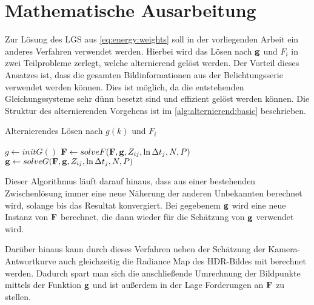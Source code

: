 \chapter{Mathematische Ausarbeitung}
\label{chap:maths}
Zur Lösung des \gls{LGS} aus \autoref{eq:energy:weights} soll in der vorliegenden Arbeit ein anderes Verfahren verwendet werden. Hierbei wird das Lösen nach $\b g$ und $F_i$ in zwei Teilprobleme zerlegt, welche alternierend gelöst werden. Der Vorteil dieses Ansatzes ist, dass die gesamten Bildinformationen aus der Belichtungsserie verwendet werden können. Dies ist möglich, da die entstehenden Gleichungssysteme sehr dünn besetzt sind und effizient gelöst werden können. Die Struktur des alternierenden Vorgehens ist im \autoref{alg:alternierend:basic} beschrieben.

\begin{Algorithmus} %
\caption{Alternierendes Lösen nach $g(k)$ und $F_i$}
\label{alg:alternierend:basic}
\begin{algorithmic}
	\State $g \gets initG()$
		\State $\mathbf F \gets solveF(\mathbf F, \mathbf g, Z_{ij}, \ln \Delta t_j, N, P)$ 
		\State $\mathbf g \gets solveG(\mathbf F, \mathbf g, Z_{ij}, \ln \Delta t_j, N, P)$
	\EndWhile
	\State \Return [$\b g$, $\b F$]
\EndFunction
\end{algorithmic}
\end{Algorithmus}

Dieser Algorithmus läuft darauf hinaus, dass aus einer bestehenden Zwischenlösung immer eine neue Näherung der anderen Unbekannten berechnet wird, solange bis das Resultat konvergiert. Bei gegebenem $\b g$ wird eine neue Instanz von $\b F$ berechnet, die dann wieder für die Schätzung von $\b g$ verwendet wird. 

Darüber hinaus kann durch dieses Verfahren neben der Schätzung der Kamera-Antwortkurve auch gleichzeitig die \gls{Radiance Map} des \gls{HDR}-Bildes mit berechnet werden. Dadurch spart man sich die anschließende Umrechnung der Bildpunkte mittels der Funktion $\b g$ und ist außerdem in der Lage Forderungen an $\b F$ zu stellen.

